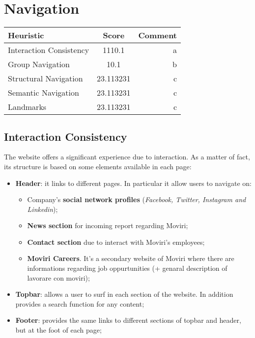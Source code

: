 \section{Navigation}
\begin{table}[H]
  \begin{center}
    \label{tab:table1}
    \begin{tabular}{l|c|r} %
      \textbf{Heuristic} & \textbf{Score} & \textbf{Comment}\\
      
      \hline
      Interaction Consistency & 1110.1 & a\\
      Group Navigation & 10.1 & b\\
      Structural Navigation & 23.113231 & c\\
      Semantic Navigation & 23.113231 & c\\
      Landmarks & 23.113231 & c\\

    \end{tabular}
  \end{center}
\end{table}

\subsection{Interaction Consistency}
The website offers a significant experience due to interaction. As a matter of fact, its structure is based on some elements available in each page:
\begin{itemize}
\item \textbf{Header}: it links to different pages. In particular it allow users to navigate on:
\begin{itemize}
\item Company's \textbf{social network profiles} (\textit{Facebook, Twitter, Instagram and Linkedin});
\item \textbf{News section} for incoming report regarding Moviri;
\item \textbf{Contact section} due to interact with Moviri's employees;
\item \textbf{Moviri Careers}. It's a secondary website of Moviri where there are informations regarding job oppurtunities (+ genaral description of lavorare con moviri);
\end{itemize}
\item \textbf{Topbar}: allows a user to surf in each section of the website. In addition provides a search function for any content; 
\item \textbf{Footer}: provides the same links to different sections of topbar and header, but at the foot of each page;
\end{itemize}
